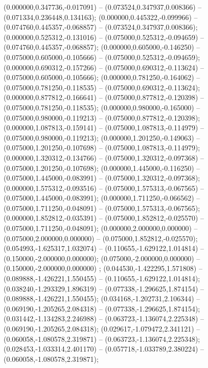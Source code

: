  (0.000000,0.347736,-0.017091) -- (0.073524,0.347937,0.008366) -- (0.071334,0.236448,0.134163);
 (0.000000,0.445322,-0.099966) -- (0.074760,0.445357,-0.068857) -- (0.073524,0.347937,0.008366);
 (0.000000,0.525312,-0.131016) -- (0.075000,0.525312,-0.094659) -- (0.074760,0.445357,-0.068857);
 (0.000000,0.605000,-0.146250) -- (0.075000,0.605000,-0.105666) -- (0.075000,0.525312,-0.094659);
 (0.000000,0.690312,-0.157266) -- (0.075000,0.690312,-0.113624) -- (0.075000,0.605000,-0.105666);
 (0.000000,0.781250,-0.164062) -- (0.075000,0.781250,-0.118535) -- (0.075000,0.690312,-0.113624);
 (0.000000,0.877812,-0.166641) -- (0.075000,0.877812,-0.120398) -- (0.075000,0.781250,-0.118535);
 (0.000000,0.980000,-0.165000) -- (0.075000,0.980000,-0.119213) -- (0.075000,0.877812,-0.120398);
 (0.000000,1.087813,-0.159141) -- (0.075000,1.087813,-0.114979) -- (0.075000,0.980000,-0.119213);
 (0.000000,1.201250,-0.149063) -- (0.075000,1.201250,-0.107698) -- (0.075000,1.087813,-0.114979);
 (0.000000,1.320312,-0.134766) -- (0.075000,1.320312,-0.097368) -- (0.075000,1.201250,-0.107698);
 (0.000000,1.445000,-0.116250) -- (0.075000,1.445000,-0.083991) -- (0.075000,1.320312,-0.097368);
 (0.000000,1.575312,-0.093516) -- (0.075000,1.575313,-0.067565) -- (0.075000,1.445000,-0.083991);
 (0.000000,1.711250,-0.066562) -- (0.075000,1.711250,-0.048091) -- (0.075000,1.575313,-0.067565);
 (0.000000,1.852812,-0.035391) -- (0.075000,1.852812,-0.025570) -- (0.075000,1.711250,-0.048091);
 (0.000000,2.000000,0.000000) -- (0.075000,2.000000,0.000000) -- (0.075000,1.852812,-0.025570);
 (0.054993,-1.625317,1.032074) -- (0.110655,-1.629122,1.014814) -- (0.150000,-2.000000,0.000000);
 (0.075000,-2.000000,0.000000) -- (0.150000,-2.000000,0.000000) ;
 (0.044530,-1.422295,1.571808) -- (0.089888,-1.426221,1.550455) -- (0.110655,-1.629122,1.014814);
 (0.038240,-1.293329,1.896319) -- (0.077338,-1.296625,1.874154) -- (0.089888,-1.426221,1.550455);
 (0.034168,-1.202731,2.106344) -- (0.069190,-1.205265,2.084318) -- (0.077338,-1.296625,1.874154);
 (0.031442,-1.134283,2.246988) -- (0.063723,-1.136074,2.225348) -- (0.069190,-1.205265,2.084318);
 (0.029617,-1.079472,2.341121) -- (0.060058,-1.080578,2.319871) -- (0.063723,-1.136074,2.225348);
 (0.028453,-1.033314,2.401170) -- (0.057718,-1.033789,2.380224) -- (0.060058,-1.080578,2.319871);
